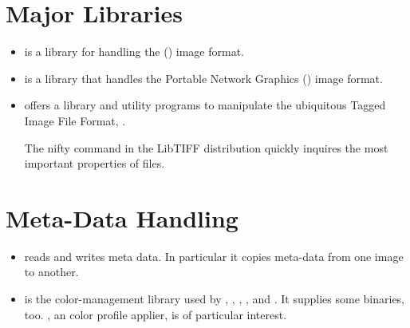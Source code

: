 \section[Libraries]{\label{sec:helpful-libraries}%
  Major Libraries}

\begin{itemize}
  \label{lib:jpeg}
\item
   is a library for handling the
  () image format.

  \label{lib:png}
\item
   is a library that handles the Portable Network
  Graphics () image format.

  \label{lib:tiff}
\item
   offers a library and utility programs
  to manipulate the ubiquitous Tagged Image File Format, .

  The nifty  command in the LibTIFF
  distribution quickly inquires the most important properties of  files.
\end{itemize}


\section[Meta-Data Handling]{\label{sec:meta-data-handling}%
  Meta-Data Handling}

\begin{itemize}
  \label{app:exiftool}
\item
   reads and writes
   meta data.  In particular it copies meta-data from
  one image to another.

  \label{app:littlecms}
\item
   is the color-management library used by
  , , , , and
  .  It supplies some binaries, too.  , an  color
  profile applier, is of particular interest.
\end{itemize}


